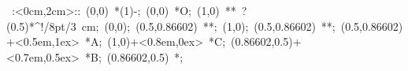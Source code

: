 %


\hbox{
\xy    <2cm,0cm>:<0cm,2cm>::
       (0,0) *\ellipse(1){-}; (0,0) *{O};
       (1,0) **\dir{-} ?(0.5)*^!/8pt/\hbox{3 cm};
       (0,0); (0.5,0.86602) **\dir{-};
       (1,0); (0.5,0.86602) **\dir{-};
       (0.5,0.86602)+<0.5em,1ex> *{A};
       (1,0)+<0.8em,0ex> *{C};
       (0.86602,0.5)+<0.7em,0.5ex> *{B};  
       (0.86602,0.5) *{\bullet};  
\endxy}

